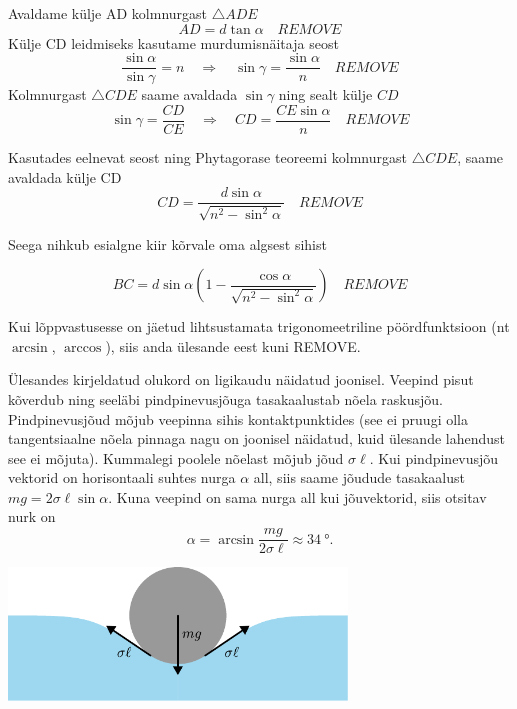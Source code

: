 \documentclass[10pt]{article}
\newcommand{\p}[1]{REMOVE}
\begin{document}
Avaldame külje AD kolmnurgast $\triangle{ADE}$
\[ AD = d\tan{\alpha} \quad \p{1}\]
Külje CD leidmiseks kasutame murdumisnäitaja seost
\[ \frac{\sin{\alpha}}{\sin{\gamma}} = n \quad \Longrightarrow \quad \sin{\gamma} = \frac{\sin{\alpha}}{n} \quad   \p{1}\]
Kolmnurgast  $\triangle{CDE}$ saame avaldada $\sin{\gamma}$ ning sealt külje $CD$
\[ \sin{\gamma} = \frac{CD}{CE} \quad \Longrightarrow \quad  CD = \frac{CE \sin{\alpha}}{n} \quad\p{1}\]

Kasutades eelnevat seost ning Phytagorase teoreemi kolmnurgast $\triangle{CDE}$,
saame avaldada külje CD
\[  CD = \frac{d\sin{\alpha}}{\sqrt{n^2-\sin^2{\alpha}}} \quad \p{2}  \]

Seega nihkub esialgne kiir kõrvale oma algsest sihist 

\[ BC = d\sin{\alpha}\left(1 - \frac{\cos{\alpha}}{\sqrt{n^2-\sin^2{\alpha}}}\right)  \quad \p{2}  \]

Kui lõppvastusesse on jäetud lihtsustamata trigonomeetriline pöördfunktsioon (nt $\arcsin$, $\arccos$), siis anda ülesande eest kuni \p{8}.
\probend
\bigskip


\solu
\par
Ülesandes kirjeldatud olukord on ligikaudu näidatud joonisel. Veepind pisut kõverdub ning seeläbi pindpinevusjõuga tasakaalustab nõela raskusjõu. Pindpinevusjõud mõjub veepinna sihis kontaktpunktides (see ei pruugi olla tangentsiaalne nõela pinnaga nagu on joonisel näidatud, kuid ülesande lahendust see ei mõjuta). Kummalegi poolele nõelast mõjub jõud $\sigma \ell$. Kui pindpinevusjõu vektorid on horisontaali suhtes nurga $\alpha$ all, siis saame jõudude tasakaalust \(mg = 2 \sigma \ell \sin \alpha\). Kuna veepind on sama nurga all kui jõuvektorid, siis otsitav nurk on
\[
\alpha = \arcsin{\frac{mg}{2\sigma \ell}} \approx \SI{34}{\degree}.
\]
\begin{center}
  \includegraphics[width=9cm]{2023-v3g-06-yl.pdf}
\end{center}
\probend
\bigskip
\end{document}
